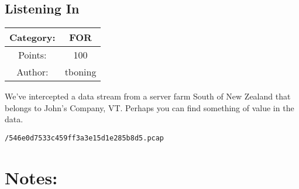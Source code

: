\begin{center}
\section*{Listening In}
{\large
\begin{tabular}{| c c |}
\hline
Category: & FOR\\\hline
Points: & 100\\\hline
Author: & tboning\\\hline
\end{tabular}
}
\end{center}
\vspace{0.5in}

{\large
We've intercepted a data stream from a server farm South of New Zealand that belongs to John's Company, VT. Perhaps you can find something of value in the data.
}
\vspace{0.25in}
\begin{center}
  {\Large\tt /546e0d7533c459ff3a3e15d1e285b8d5.pcap}
\end{center}

\vspace{0.25in}
\section*{Notes:}
